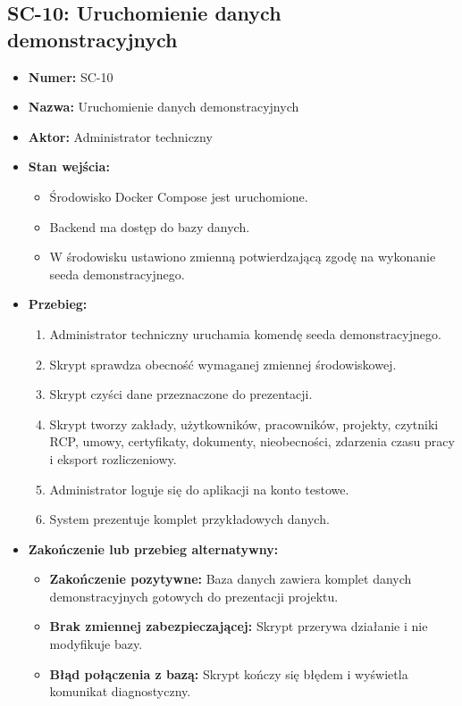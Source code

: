\subsection{SC-10: Uruchomienie danych demonstracyjnych}
\begin{itemize}
    \item \textbf{Numer:} SC-10
    \item \textbf{Nazwa:} Uruchomienie danych demonstracyjnych
    \item \textbf{Aktor:} Administrator techniczny
    \item \textbf{Stan wejścia:}
    \begin{itemize}
        \item Środowisko Docker Compose jest uruchomione.
        \item Backend ma dostęp do bazy danych.
        \item W środowisku ustawiono zmienną potwierdzającą zgodę na wykonanie seeda demonstracyjnego.
    \end{itemize}
    \item \textbf{Przebieg:}
    \begin{enumerate}
        \item Administrator techniczny uruchamia komendę seeda demonstracyjnego.
        \item Skrypt sprawdza obecność wymaganej zmiennej środowiskowej.
        \item Skrypt czyści dane przeznaczone do prezentacji.
        \item Skrypt tworzy zakłady, użytkowników, pracowników, projekty, czytniki RCP, umowy, certyfikaty, dokumenty, nieobecności, zdarzenia czasu pracy i eksport rozliczeniowy.
        \item Administrator loguje się do aplikacji na konto testowe.
        \item System prezentuje komplet przykładowych danych.
    \end{enumerate}
    \item \textbf{Zakończenie lub przebieg alternatywny:}
    \begin{itemize}
        \item \textbf{Zakończenie pozytywne:} Baza danych zawiera komplet danych demonstracyjnych gotowych do prezentacji projektu.
        \item \textbf{Brak zmiennej zabezpieczającej:} Skrypt przerywa działanie i nie modyfikuje bazy.
        \item \textbf{Błąd połączenia z bazą:} Skrypt kończy się błędem i wyświetla komunikat diagnostyczny.
    \end{itemize}
\end{itemize}